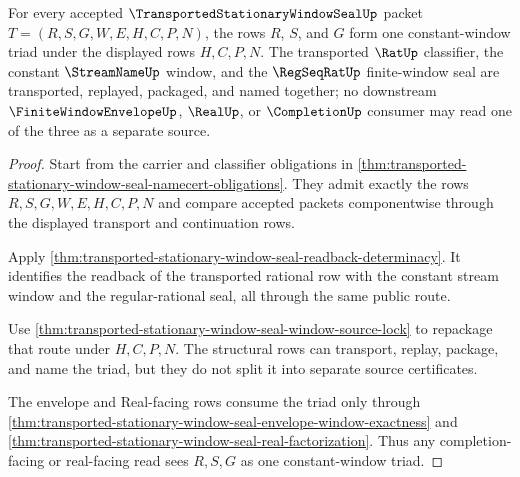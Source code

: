 \begin{theorem}
\label{thm:transported-stationary-window-seal-constant-window-triad}
For every accepted $\TransportedStationaryWindowSealUp$ packet $T=(R,S,G,W,E,H,C,P,N)$, the rows $R$, $S$, and $G$ form one constant-window triad under the displayed rows $H,C,P,N$. The transported $\RatUp$ classifier, the constant $\StreamNameUp$ window, and the $\RegSeqRatUp$ finite-window seal are transported, replayed, packaged, and named together; no downstream $\FiniteWindowEnvelopeUp$, $\RealUp$, or $\CompletionUp$ consumer may read one of the three as a separate source.
\end{theorem}
\begin{proof}
Start from the carrier and classifier obligations in \autoref{thm:transported-stationary-window-seal-namecert-obligations}. They admit exactly the rows $R,S,G,W,E,H,C,P,N$ and compare accepted packets componentwise through the displayed transport and continuation rows.

Apply \autoref{thm:transported-stationary-window-seal-readback-determinacy}. It identifies the readback of the transported rational row with the constant stream window and the regular-rational seal, all through the same public route.

Use \autoref{thm:transported-stationary-window-seal-window-source-lock} to repackage that route under $H,C,P,N$. The structural rows can transport, replay, package, and name the triad, but they do not split it into separate source certificates.

The envelope and Real-facing rows consume the triad only through \autoref{thm:transported-stationary-window-seal-envelope-window-exactness} and \autoref{thm:transported-stationary-window-seal-real-factorization}. Thus any completion-facing or real-facing read sees $R,S,G$ as one constant-window triad.
\end{proof}

